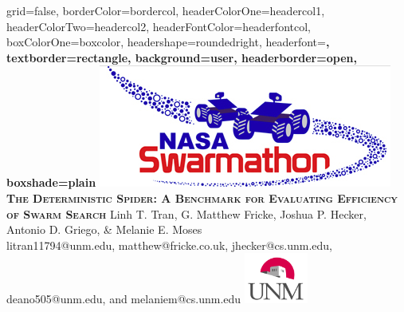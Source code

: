 \documentclass[a0paper,portrait]{baposter}
\begin{document}
\begin{poster}{
grid=false,
borderColor=bordercol, %
headerColorOne=headercol1, %
headerColorTwo=headercol2, %
headerFontColor=headerfontcol, %
boxColorOne=boxcolor, %
headershape=roundedright, %
headerfont=\Large\sf\bf, %
textborder=rectangle,
background=user,
headerborder=open, %
boxshade=plain
}
{\includegraphics[scale=0.20]{SwarmathonLogo.png}}  %
%
%
{\sf\bf\textsc{The Deterministic Spider: A Benchmark for Evaluating Efficiency of Swarm Search}} %
{Linh T. Tran, G. Matthew Fricke, Joshua P. Hecker, Antonio D. Griego, \& Melanie E. Moses\\ %
{\smaller litran11794@unm.edu, matthew@fricke.co.uk, jhecker@cs.unm.edu, deano505@unm.edu, and melaniem@cs.unm.edu}} %
{\includegraphics[height=4.5em]{UNMLogoVertColor.jpg}} %


\end{poster}
\end{document}
